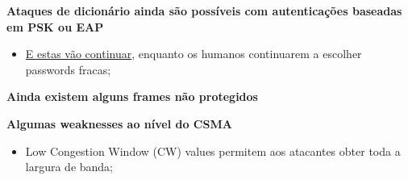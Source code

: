 \documentclass{article}
\begin{document}
\begin{flushleft}
  \textbf{Ataques de dicionário ainda são possíveis com autenticações
  baseadas em PSK ou EAP}
  \begin{itemize}
    \item \uline{E estas vão continuar}, enquanto os humanos continuarem
    a escolher passwords fracas;
  \end{itemize}

  \textbf{Ainda existem alguns frames não protegidos}

  \vspace{2mm}

  \textbf{Algumas weaknesses ao nível do CSMA}
  \begin{itemize}
    \item Low Congestion Window (CW) values permitem aos atacantes
    obter toda a largura de banda;
  \end{itemize}
\end{flushleft}
\end{document}
